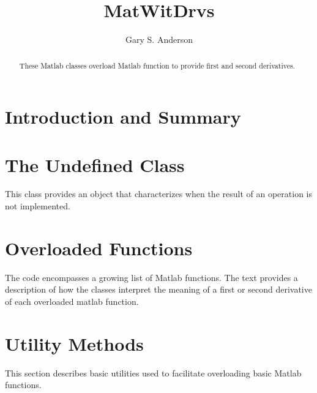 \documentclass{article}
\title{MatWitDrvs}
\author{Gary S. Anderson}
\begin{document}
\maketitle
\begin{abstract}
These Matlab classes overload Matlab function to provide first and second
derivatives.
\end{abstract}

\section{Introduction and Summary}

\section{The Undefined Class}

This class provides an object that characterizes when the result of an operation
is not implemented.

\section{Overloaded Functions}

The code encompasses a growing list of Matlab functions.  The text provides a
description of how the classes interpret the meaning of a first or second
derivative of each overloaded matlab function.


\section{Utility Methods}

This section describes basic utilities used to facilitate overloading basic
Matlab functions.
\end{document}
